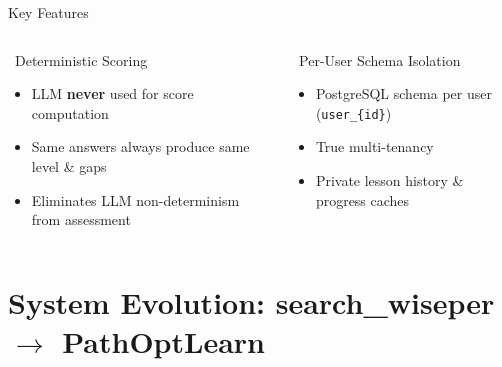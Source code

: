\documentclass[aspectratio=169,9pt]{beamer}
\begin{document}
\begin{frame}{Key Features}
\begin{columns}[T]
  \begin{block}{\faCheckCircle\ Deterministic Scoring}
    \begin{itemize}
      \item LLM \textbf{never} used for score computation
      \item Same answers always produce same level \& gaps
      \item Eliminates LLM non-determinism from assessment
    \end{itemize}
  \end{block}

  \begin{block}{\faUsers\ Per-User Schema Isolation}
    \begin{itemize}
      \item PostgreSQL schema per user (\texttt{user\_\{id\}})
      \item True multi-tenancy
      \item Private lesson history \& progress caches
    \end{itemize}
  \end{block}
\end{columns}
\end{frame}

\section{System Evolution: search\_wiseper \texorpdfstring{$\to$}{->} PathOptLearn}
\end{document}
